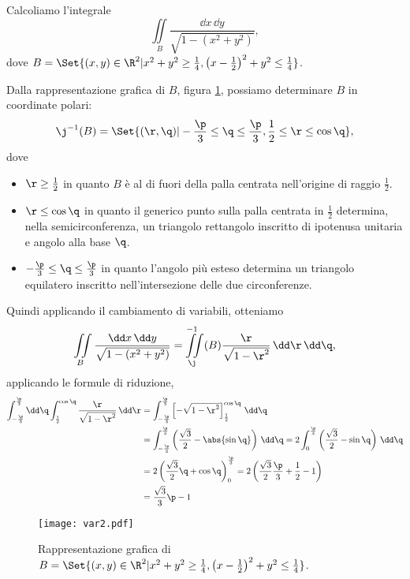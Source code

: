 \begin{ese}
	Calcoliamo l'integrale
	\[
		\iint\limits_B \frac{\dd x\,\dd y}{\sqrt{1-(x^2+y^2)}},
	\]
	dove \(B=\Set{(x,y)\in\R^2 | x^2+y^2\ge \frac{1}{4}, \left(x-\frac{1}{2}\right)^2+y^2 \le \frac{1}{4}}\).

	Dalla rappresentazione grafica di \(B\), figura \ref{fig:var2}, possiamo determinare \(B\) in coordinate polari:
	\[
		\j^{-1}(B) = \Set{(\r,\q) | -\frac{\p}{3} \le \q \le \frac{\p}{3}, \frac{1}{2} \le \r \le \cos\q},
	\]
	dove
	\begin{itemize}
		\item \(\r \ge \frac{1}{2}\) in quanto \(B\) è al di fuori della palla centrata nell'origine di raggio \(\frac{1}{2}\).\\
		\item \(\r \le \cos\q\) in quanto il generico punto sulla palla centrata in \(\frac{1}{2}\) determina, nella semicirconferenza, un triangolo rettangolo inscritto di ipotenusa unitaria e angolo alla base \(\q\).\\
		\item \(-\frac{\p}{3} \le \q \le \frac{\p}{3}\) in quanto l'angolo più esteso determina un triangolo equilatero inscritto nell'intersezione delle due circonferenze.
	\end{itemize}
	Quindi applicando il cambiamento di variabili, otteniamo
	\[
		\iint\limits_B \frac{\dd x\,\dd y}{\sqrt{1-(x^2+y^2)}} = \iint\limits_\j^{-1}(B) \frac{\r}{\sqrt{1-\r^2}}\,\dd\r\,\dd\q,
	\]
	applicando le formule di riduzione,
	\[
		\begin{split}
			\int_{-\frac{\p}{3}}^{\frac{\p}{3}}\dd\q \int_{\frac{1}{2}}^{\cos\q} \frac{\r}{\sqrt{1-\r^2}}\,\dd\r & = \int_{-\frac{\p}{3}}^{\frac{\p}{3}} \left[ -\sqrt{1-\r^2} \right]_{\frac{1}{2}}^{\cos\q}\,\dd\q\\
			& = \int_{-\frac{\p}{3}}^{\frac{\p}{3}} \left( \frac{\sqrt{3}}{2}-\abs{\sin\q} \right)\,\dd\q = 2\int_0^{\frac{\p}{3}} \left( \frac{\sqrt{3}}{2}-\sin\q \right)\,\dd\q\\
			& = 2 \left( \frac{\sqrt{3}}{2}\q+\cos\q \right)_0^{\frac{\p}{3}} = 2 \left( \frac{\sqrt{3}}{2}\frac{\p}{3}+\frac{1}{2}-1 \right)\\
			& = \frac{\sqrt{3}}{3}\p-1
		\end{split}
	\]
\end{ese}

\begin{figure}[tp]
	\begin{centering}
		\texttt{[image: var2.pdf]}
		\caption{Rappresentazione grafica di \(B=\Set{(x,y)\in\R^2 | x^2+y^2\ge \frac{1}{4}, \left(x-\frac{1}{2}\right)^2+y^2 \le \frac{1}{4}}\).}
		\label{fig:var2}
	\end{centering}
\end{figure}

